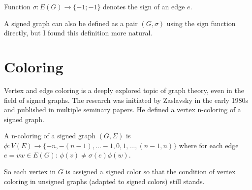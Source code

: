 \begin{definition}
    Function $\sigma : E(G) \rightarrow \{+1; -1\}$ denotes the sign of an edge $e$.
\end{definition}

A signed graph can also be defined as a pair $(G, \sigma)$ using the sign function directly,
but I found this definition more natural.

\section{Coloring}

Vertex and edge coloring is a deeply explored topic of graph theory, even in the field of signed graphs.
The research was initiated by Zaslavsky\cite{zaslavsky} in the early 1980s and published in multiple seminary papers.
He defined a vertex n-coloring of a signed graph.

\begin{definition}[Zaslavsky]
    A n-coloring of a signed graph $(G, \Sigma)$ is 
    $\phi : V(E) \rightarrow \{-n, -(n-1), \dots -1, 0, 1, \dots, (n-1, n)\}$
    where for each edge $e = vw \in E(G)$: $\phi (v) \neq \sigma (e) \phi (w)$.
\end{definition}

So each vertex in $G$ is assigned a signed color so that the condition of vertex coloring in unsigned graphs (adapted to signed colors) still stands.

